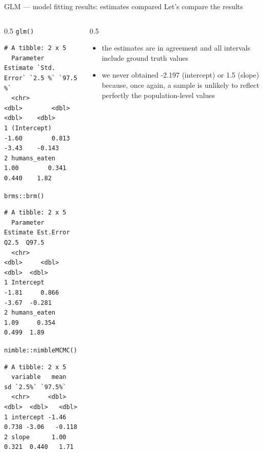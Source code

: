 \documentclass[
  10pt,
  ignorenonframetext,
  aspectratio=169,
  t]{beamer}
\let\oldtexttt\texttt
\renewcommand{\texttt}[1]{\colorbox{gray!20}{\oldtexttt{#1}}}
\begin{document}
\begin{frame}[fragile]{GLM --- model fitting results: estimates
compared}
\protect{}\label{glm-model-fitting-results-estimates-compared}
Let's compare the results

\begin{columns}[T]
\begin{column}{0.5\linewidth}
\texttt{glm()}

\scriptsize

\begin{verbatim}
# A tibble: 2 x 5
  Parameter    Estimate `Std. Error` `2.5 %` `97.5 %`
  <chr>           <dbl>        <dbl>   <dbl>    <dbl>
1 (Intercept)     -1.60        0.813  -3.43    -0.143
2 humans_eaten     1.00        0.341   0.440    1.82 
\end{verbatim}

\normalsize

\vspace{1em}

\texttt{brms::brm()}

\scriptsize

\begin{verbatim}
# A tibble: 2 x 5
  Parameter    Estimate Est.Error   Q2.5  Q97.5
  <chr>           <dbl>     <dbl>  <dbl>  <dbl>
1 Intercept       -1.81     0.866 -3.67  -0.281
2 humans_eaten     1.09     0.354  0.499  1.89 
\end{verbatim}

\normalsize

\vspace{1em}

\texttt{nimble::nimbleMCMC()}

\scriptsize

\begin{verbatim}
# A tibble: 2 x 5
  variable   mean    sd `2.5%` `97.5%`
  <chr>     <dbl> <dbl>  <dbl>   <dbl>
1 intercept -1.46 0.738 -3.06   -0.118
2 slope      1.00 0.321  0.440   1.71 
\end{verbatim}

\normalsize
\end{column}

\pause

\begin{column}{0.5\linewidth}
\begin{itemize}
\item<2-> the estimates are in agreement and all intervals include ground truth values
\vspace{1em}
\item<3-> we never obtained -2.197 (intercept) or 1.5 (slope) because, once again, a sample is unlikely to reflect perfectly the population-level values
\end{itemize}
\end{column}
\end{columns}
\end{frame}
\end{document}
